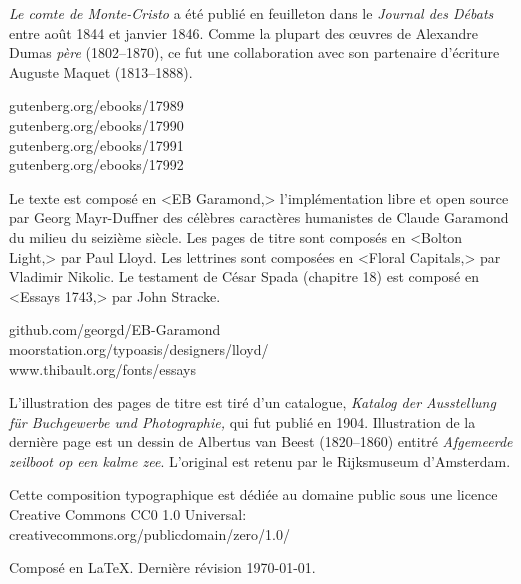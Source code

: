 \documentclass[
a5paper,
]{scrbook}
\begin{document}
\vfill
\begin{minipage}{\textwidth}
\textit{Le comte de Monte-Cristo} a été publié en feuilleton dans le \textit{Journal des Débats} entre août 1844 et janvier 1846.  Comme la plupart des œuvres de Alexandre Dumas \textit{père} (1802--1870), ce fut une collaboration avec son partenaire d'écriture Auguste Maquet (1813--1888).
\end{minipage}
\vfill
gutenberg.org/ebooks/17989\\
gutenberg.org/ebooks/17990\\
gutenberg.org/ebooks/17991\\
gutenberg.org/ebooks/17992
\vfill
\divider
\vfill
\begin{minipage}{\textwidth}
Le texte est composé en <EB Garamond,> l'implémentation libre et open source par Georg Mayr-Duffner des célèbres caractères humanistes de Claude Garamond du milieu du seizième siècle. Les pages de titre sont composés en <Bolton Light,> par Paul Lloyd. Les lettrines sont composées en <Floral Capitals,> par Vladimir Nikolic. Le testament de César Spada (chapitre 18) est composé en <Essays 1743,> par John Stracke. 
\end{minipage}
\vfill
github.com/georgd/EB-Garamond\\moorstation.org/typoasis/designers/lloyd/\\www.thibault.org/fonts/essays\\
\vfill
\divider
\vfill
\begin{minipage}{\textwidth}
L'illustration des pages de titre est tiré d'un catalogue, \textit{Katalog der Ausstellung für Buchgewerbe und Photographie,} qui fut publié en 1904. Illustration de la dernière page est un dessin de Albertus van Beest (1820--1860) entitré \textit{Afgemeerde zeilboot op een kalme zee}. L'original est retenu par le Rijksmuseum d'Amsterdam.
\end{minipage}
\vfill
\divider
\vfill
\begin{minipage}{\textwidth}
Cette composition typographique est dédiée au domaine public sous une licence Creative Commons CC0 1.0 Universal: creativecommons.org/publicdomain/zero/1.0/\
\end{minipage}
\vfill
\divider
\vfill
Composé en \LaTeX{}. Dernière révision \today.
\thispagestyle{empty}
\end{document}
